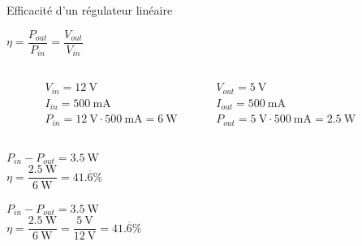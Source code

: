 \begin{frame}{Efficacité d'un régulateur linéaire}
    \begin{center}
        $\eta = \dfrac{P_{out}}{P_{in}} = \dfrac{V_{out}}{V_{in}}$

        \vfill

        \pause

        \begin{columns}
            \begin{column}{0.125\textwidth}\end{column}


            \begin{column}{0.375\textwidth}
                \centering
                 {
                    $V_{in} = \SI{12}{\volt}$\\
                }
                 {
                    $I_{in} = \SI{500}{\milli\ampere}$\\
                }
                 {
                    $P_{in} = \SI{12}{\volt} \cdot \SI{500}{\milli\ampere} = \SI{6}{\watt}$\\
                }

            \end{column}

            \begin{column}{0.375\textwidth}
                \centering
                 {
                    $V_{out} = \SI{5}{\volt}$\\
                    $I_{out} = \SI{500}{\milli\ampere}$\\
                }
                 {
                    $P_{out} = \SI{5}{\volt} \cdot \SI{500}{\milli\ampere} = \SI{2.5}{\watt}$\\
                }
            \end{column}

            \begin{column}{0.125\textwidth}\end{column}
        \end{columns}

        \vfill
         {
            $P_{in} - P_{out} = \SI{3.5}{\watt}$\\
            \vspace{6pt}
            $\eta = \dfrac{\SI{2.5}{\watt}}{\SI{6}{\watt}}
                  = 41.\overline{6} \% $\\
        }
        
         {
            $P_{in} - P_{out} = \SI{3.5}{\watt}$\\
            \vspace{6pt}
            $\eta = \dfrac{\SI{2.5}{\watt}}{\SI{6}{\watt}}      = \dfrac{\SI{5}{\volt}}{\SI{12}{\volt}}
                  = 41.\overline{6} \% $\\
        }
    \end{center}
\end{frame}

